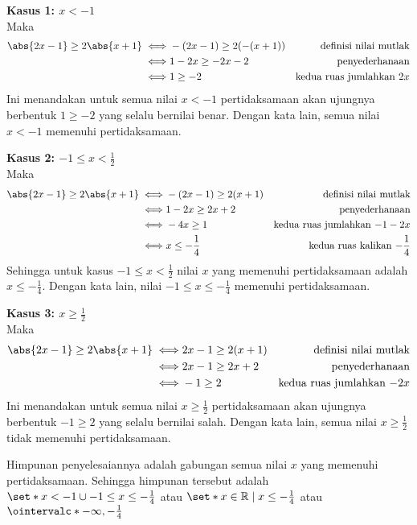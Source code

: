 \begin{enumerate}[leftmargin=*, label={\arabic*}.]

\textbf{Kasus 1: $x < -1$}\\
Maka
\begin{align*}
    \abs{2x-1} \geq 2\abs{x+1} 
    \iff &-(2x-1) \geq 2(-(x+1)) 
    &\text{definisi nilai mutlak} \\
    \iff &1-2x \geq -2x-2
    &\text{penyederhanaan}\\
    \iff &1 \geq -2
    &\text{kedua ruas jumlahkan $2x$}
\end{align*}
Ini menandakan untuk semua nilai $x < -1$ pertidaksamaan akan ujungnya 
berbentuk $1 \geq -2$ yang selalu bernilai benar. Dengan kata lain, semua 
nilai $x < -1$ memenuhi pertidaksamaan.

\textbf{Kasus 2: $-1 \leq x < \frac{1}{2}$}\\
Maka
\begin{align*}
    \abs{2x-1} \geq 2\abs{x+1} 
    \iff &-(2x-1) \geq 2(x+1)
    &\text{definisi nilai mutlak} \\
    \iff &1-2x \geq 2x+2
    &\text{penyederhanaan}\\
    \iff &-4x \geq 1
    &\text{kedua ruas jumlahkan $-1-2x$}\\
    \iff &x \leq -\frac{1}{4}
    &\text{kedua ruas kalikan $-\frac{1}{4}$}
\end{align*}
Sehingga untuk kasus $-1 \leq x < \frac{1}{2}$ nilai $x$ yang memenuhi 
pertidaksamaan adalah $x \leq -\frac{1}{4}$. Dengan kata lain, nilai 
$-1 \leq x \leq -\frac{1}{4}$ memenuhi pertidaksamaan.

\textbf{Kasus 3: $x \geq \frac{1}{2}$}\\
Maka
\begin{align*}
    \abs{2x-1} \geq 2\abs{x+1} 
    \iff &2x-1 \geq 2(x+1)
    &\text{definisi nilai mutlak} \\
    \iff &2x-1 \geq 2x+2
    &\text{penyederhanaan}\\
    \iff &-1 \geq 2
    &\text{kedua ruas jumlahkan $-2x$}
\end{align*}
Ini menandakan untuk semua nilai $x \geq \frac{1}{2}$ pertidaksamaan 
akan ujungnya berbentuk $-1 \geq 2$ yang selalu bernilai salah.
Dengan kata lain, semua nilai $x \geq \frac{1}{2}$ tidak memenuhi 
pertidaksamaan.

Himpunan penyelesaiannya adalah gabungan semua nilai $x$ yang memenuhi 
pertidaksamaan. Sehingga himpunan tersebut adalah 
$\set*{x < -1 \cup -1 \leq x \leq -\frac{1}{4}}$ 
atau $\set*{x \in \mathbb{R} \mid x \leq -\frac{1}{4}}$
atau $\ointervalc*{-\infty,-\frac{1}{4}}$


\end{enumerate}
